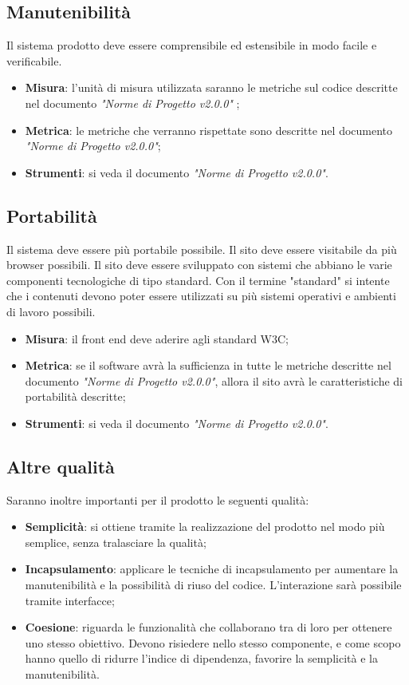 \documentclass[12pt,a4paper,titlepage]{article}
\begin{document}
		\subsection{Manutenibilità}
		Il sistema prodotto deve essere comprensibile ed estensibile in modo facile e verificabile.
		\begin{itemize}
			\item \textbf{Misura}: l'unità di misura utilizzata saranno le metriche sul codice descritte nel documento \textit{"Norme di Progetto v2.0.0"} ;
			\item \textbf{Metrica}: le metriche che verranno rispettate sono descritte nel documento \textit{"Norme di Progetto v2.0.0"};
			\item \textbf{Strumenti}: si veda il documento \textit{"Norme di Progetto v2.0.0"}.
		\end{itemize}
	
		\subsection{Portabilità}
		Il sistema deve essere più portabile possibile. Il sito deve essere visitabile da più browser possibili. Il sito deve essere sviluppato con sistemi che abbiano le varie componenti tecnologiche di tipo standard. Con il termine "standard" si intente che i contenuti devono poter essere utilizzati su più sistemi operativi e ambienti di lavoro possibili.
			\begin{itemize}
				\item \textbf{Misura}: il front end deve aderire agli standard W3C;
				\item \textbf{Metrica}: se il software avrà la sufficienza in tutte le metriche descritte nel documento \textit{"Norme di Progetto v2.0.0"}, allora il sito avrà le caratteristiche di portabilità descritte;
				\item \textbf{Strumenti}: si veda il documento \textit{"Norme di Progetto v2.0.0"}.
			\end{itemize}
		
		\subsection{Altre qualità}
		Saranno inoltre importanti per il prodotto le seguenti qualità:
		\begin{itemize}
			\item \textbf{Semplicità}: si ottiene tramite la realizzazione del prodotto nel modo più semplice, senza tralasciare la qualità;
			\item \textbf{Incapsulamento}: applicare le tecniche di incapsulamento per aumentare la manutenibilità e la possibilità di riuso del codice. L'interazione sarà possibile tramite interfacce;
			\item \textbf{Coesione}: riguarda le funzionalità che collaborano tra di loro per ottenere uno stesso obiettivo. Devono risiedere nello stesso componente, e come scopo hanno quello di ridurre l'indice di dipendenza, favorire la semplicità e la manutenibilità.
		\end{itemize}
	
\end{document}
